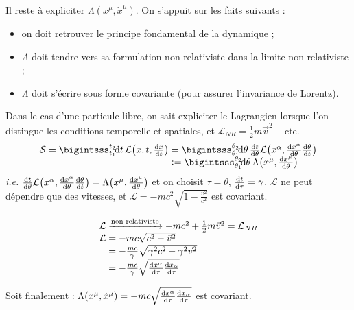 Il reste à expliciter $\Lambda(x^\mu,\dot{x}^\mu)$. On s'appuit sur les faits suivants :
\begin{itemize}
	\item on doit retrouver le principe fondamental de la dynamique ;
	\item $\Lambda$ doit tendre vers sa formulation non relativiste dans la limite non relativiste ;
	\item $\Lambda$ doit s'écrire sous forme covariante (pour assurer l'invariance de Lorentz). 
\end{itemize}

{\txt Dans le cas d'une particule libre, on sait expliciter le Lagrangien lorsque l'on distingue les conditions temporelle et spatiales, et $\mathcal{L}_{NR}=\frac{1}{2}m\vec{v}^2+\mathrm{cte}$.}
$$
	\begin{array}{r@{\;}l}
		\mathcal{S}=\bigintsss_{t_1}^{t_2} \! \dif t\,\mathcal{L}\!\left(x,t,\frac{\dif x}{\dif t}\right) &= \bigintsss_{\theta_1}^{\theta_2} \!\dif \theta\,\frac{\dif t}{\dif\theta}\mathcal{L}\!\left(x^{\alpha},\frac{\dif x^{\alpha}}{\dif \theta}\frac{\dif\theta}{\dif t}\right)\\
		&\defeq  \bigintsss_{\theta_1}^{\theta_2} \!\dif \theta\,\Lambda\!\left(x^{\mu},\frac{\dif x^{\mu}}{\dif \theta}\right)
	\end{array}
$$
\emph{i.e.} $\frac{\mathrm{d} t}{\mathrm{d}\theta}\mathcal{L}\!\left(x^{\alpha},\frac{\mathrm{d} x^{\alpha}}{\mathrm{d} \theta}\frac{\mathrm{d}\theta}{\mathrm{d} t}\right) =\Lambda\!\left(x^{\mu},\frac{\mathrm{d} x^{\mu}}{\mathrm{d} \theta}\right)$ et on choisit $\tau=\theta$, $\frac{\mathrm{d} t}{\mathrm{d} \tau}=\gamma$.
$\mathcal{L}$ ne peut dépendre que des vitesses, et $\mathcal{L}=-mc^2\sqrt{1-\frac{v^2}{c^2}}$ est covariant.

$$
	\begin{array}{r@{\;}l}
		\mathcal{L}&\xrightarrow{\text{non relativiste}}-mc^2+\frac{1}{2}m\vec{v}^2=\mathcal{L}_{NR}\\
		\mathcal{L}&=-mc\sqrt{c^2-\vec{v}^2}\\
			&=-\frac{mc}{\gamma}\sqrt{\gamma^2c^2-\gamma^2\vec{v}^2}\\
			&=-\frac{mc}{\gamma}\sqrt{\frac{\dif x^{\alpha}}{\dif\tau}\frac{\dif x_{\alpha}}{\dif\tau}}
	\end{array}$$

Soit finalement : $\Lambda(x^\mu,\dot{x}^\mu)=-mc\sqrt{\frac{\mathrm{d} x^{\alpha}}{\mathrm{d}\tau}\frac{\mathrm{d} x_{\alpha}}{\mathrm{d}\tau}}$ est covariant.

